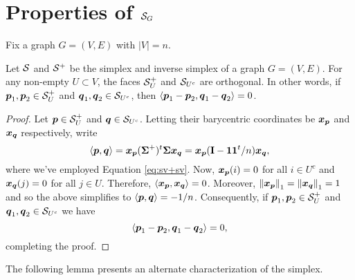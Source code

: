 \section{Properties of \texorpdfstring{$\mathcal{S}_G$}{Graph Simplices}}
Fix a graph $G=(V,E)$ with $|V|=n$.



\begin{lemma}
\label{lem:faces_orthogonal}
Let $\mathcal{S}$ and $\mathcal{S}^+$ be the simplex and inverse simplex of a graph $G=(V,E)$. For any non-empty $U\subset V$,  
the faces $\mathcal{S}^+_U$ and $\mathcal{S}_{U^c}$ are orthogonal. In other words, if $\vb*{p}_1,\vb*{p}_2\in \mathcal{S}_U^+$ and $\vb*{q}_1,\vb*{q}_2\in \mathcal{S}_{U^c}$, then $\langle \vb*{p}_1-\vb*{p}_2,\vb*{q}_1-\vb*{q}_2\rangle=0$. 
\end{lemma}
\begin{proof}
Let $\vb*{p}\in \mathcal{S}^+_U$ and $\vb*{q}\in \mathcal{S}_{U^c}$. Letting their barycentric coordinates be $\vb*{x}_{\vb*{p}}$ and $\vb*{x}_{\vb*{q}}$ respectively, write 
\[\langle \vb*{p},\vb*{q}\rangle = \vb*{x}_{\vb*{p}} (\boldsymbol{\Sigma}^+)^t \boldsymbol{\Sigma} \vb*{x}_{\vb*{q}}=\vb*{x}_{\vb*{p}}(\vb{I}-\vb{1}\vb{1}^t/n) \vb*{x}_{\vb*{q}},\]
where we've employed Equation \eqref{eq:sv+sv}. Now, $\vb*{x}_{\vb*{p}}(i)=0$ for all $i\in U^c$ and $\vb*{x}_{\vb*{q}}(j)=0$ for all $j\in U$. Therefore, $\langle \vb*{x}_{\vb*{p}},\vb*{x}_{\vb*{q}}\rangle =0$. Moreover, $\norm{\vb*{x}_{\vb*{p}}}_1=\norm{\vb*{x}_{\vb*{q}}}_1=1$ and so the above simplifies to $\langle \vb*{p},\vb*{q}\rangle = -1/n$. Consequently, if $\vb*{p}_1,\vb*{p}_2\in \mathcal{S}_U^+$ and $\vb*{q}_1,\vb*{q}_2\in\mathcal{S}_{U^c}$ we have 
\[\langle \vb*{p}_1-\vb*{p}_2,\vb*{q}_1-\vb*{q}_2\rangle = 0,\]
completing the proof. 
\end{proof}

The following lemma presents an alternate characterization of the simplex. 

